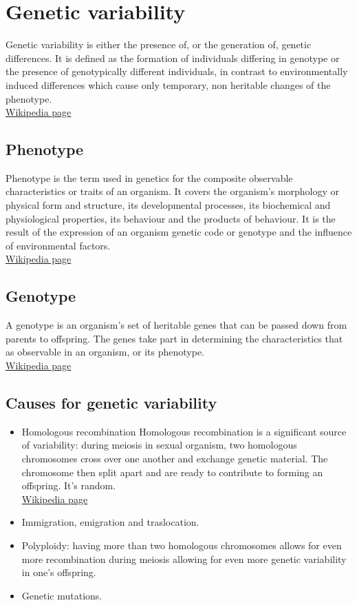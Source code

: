 \section{Genetic variability}
Genetic variability is either the presence of, or the generation of, genetic differences.
It is defined as the formation of individuals differing in genotype or the presence of genotypically different individuals, in contrast to environmentally induced differences which cause only temporary, non heritable changes of the phenotype.\\
\href{https://en.wikipedia.org/wiki/Genetic_variability}{Wikipedia page}
\subsection{Phenotype}
Phenotype is the term used in genetics for the composite observable characteristics or traits of an organism.
It covers the organism's morphology or physical form and structure, its developmental processes, its biochemical and physiological properties, its behaviour and the products of behaviour.
It is the result of the expression of an organism genetic code or genotype and the influence of environmental factors.\\
\href{https://en.wikipedia.org/wiki/Phenotype}{Wikipedia page}
\subsection{Genotype}
A genotype is an organism's set of heritable genes that can be passed down from parents to offspring.
The genes take part in determining the characteristics that as observable in an organism, or its phenotype.\\
\href{https://en.wikipedia.org/wiki/Genotype}{Wikipedia page}
\subsection{Causes for genetic variability}
\begin{itemize}
\item Homologous recombination
Homologous recombination is a significant source of variability: during meiosis in sexual organism, two homologous chromosomes cross over one another and exchange genetic material.
The chromosome then split apart and are ready to contribute to forming an offspring.
It's random.\\
	\href{https://en.wikipedia.org/wiki/Homologous_recombination}{Wikipedia page}
\item Immigration, emigration and traslocation.
\item Polyploidy: having more than two homologous chromosomes allows for even more recombination during meiosis allowing for even more genetic variability in one's offspring.
\item Genetic mutations.
\end{itemize}
